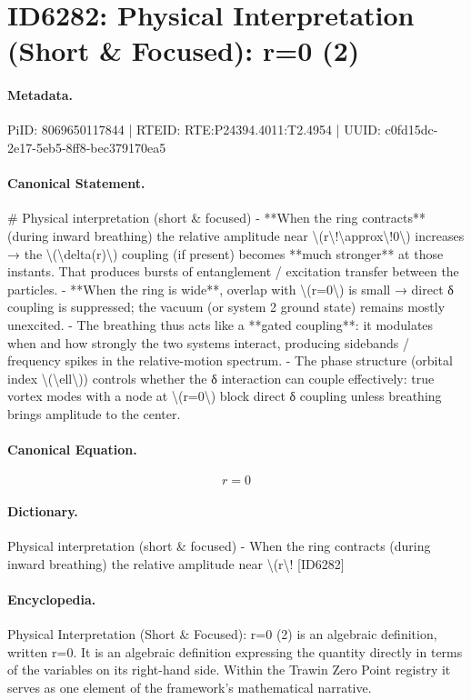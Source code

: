 \section*{ID6282: Physical Interpretation (Short \& Focused): r=0 (2)}
\paragraph{Metadata.}
PiID: 8069650117844 | RTEID: RTE:P24394.4011:T2.4954 | UUID: c0fd15dc-2e17-5eb5-8ff8-bec379170ea5

\paragraph{Canonical Statement.}
\# Physical interpretation (short \& focused) - **When the ring contracts** (during inward breathing) the relative amplitude near \textbackslash{}(r\textbackslash{}!\textbackslash{}approx\textbackslash{}!0\textbackslash{}) increases → the \textbackslash{}(\textbackslash{}delta(r)\textbackslash{}) coupling (if present) becomes **much stronger** at those instants. That produces bursts of entanglement / excitation transfer between the particles. - **When the ring is wide**, overlap with \textbackslash{}(r=0\textbackslash{}) is small → direct δ coupling is suppressed; the vacuum (or system 2 ground state) remains mostly unexcited. - The breathing thus acts like a **gated coupling**: it modulates when and how strongly the two systems interact, producing sidebands / frequency spikes in the relative-motion spectrum. - The phase structure (orbital index \textbackslash{}(\textbackslash{}ell\textbackslash{})) controls whether the δ interaction can couple effectively: true vortex modes with a node at \textbackslash{}(r=0\textbackslash{}) block direct δ coupling unless breathing brings amplitude to the center.

\paragraph{Canonical Equation.}
\[
r=0
\]

\paragraph{Dictionary.}
Physical interpretation (short \& focused) - When the ring contracts (during inward breathing) the relative amplitude near \textbackslash{}(r\textbackslash{}! [ID6282]

\paragraph{Encyclopedia.}
Physical Interpretation (Short \& Focused): r=0 (2) is an algebraic definition, written r=0. It is an algebraic definition expressing the quantity directly in terms of the variables on its right-hand side. Within the Trawin Zero Point registry it serves as one element of the framework's mathematical narrative.
